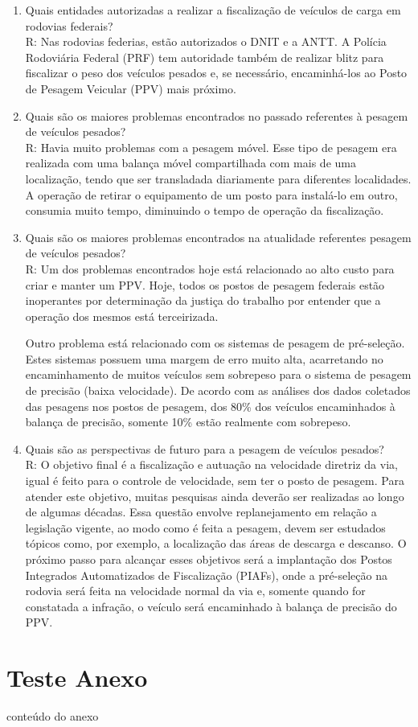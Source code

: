 \documentclass{ufscThesis}
\begin{document}
\begin{enumerate}
\item Quais entidades autorizadas a realizar a fiscalização de veículos de carga em rodovias federais?\\
R: Nas rodovias federias, estão autorizados o DNIT e a ANTT. A Polícia Rodoviária Federal (PRF) tem autoridade também de realizar blitz para fiscalizar o peso dos veículos pesados e, se necessário, encaminhá-los ao Posto de Pesagem Veicular (PPV) mais próximo.

\item Quais são os maiores problemas encontrados no passado referentes à pesagem de veículos pesados?\\
R: Havia muito problemas com a pesagem móvel. Esse tipo de pesagem era realizada com uma balança móvel compartilhada com mais de uma localização, tendo que ser transladada diariamente para diferentes localidades. A operação de retirar o equipamento de um posto para instalá-lo em outro, consumia muito tempo, diminuindo o tempo de operação da fiscalização.

\item Quais são os maiores problemas encontrados na atualidade referentes pesagem de veículos pesados?\\
R: Um dos problemas encontrados hoje está relacionado ao alto custo para criar e manter um PPV. Hoje, todos os postos de pesagem federais estão inoperantes por determinação da justiça do trabalho por entender que a operação dos mesmos está terceirizada. 

Outro problema está relacionado com os sistemas de pesagem de pré-seleção. 
Estes sistemas possuem uma margem de erro muito alta, acarretando no encaminhamento de muitos veículos sem sobrepeso para o sistema de pesagem de precisão (baixa velocidade). De acordo com as análises dos dados coletados das pesagens nos postos de pesagem, dos 80\% dos veículos encaminhados à balança de precisão, somente 10\% estão realmente com sobrepeso.

\item Quais são as perspectivas de futuro para a pesagem de veículos pesados?\\
R: O objetivo final é a fiscalização e autuação na velocidade diretriz da via, igual é feito para o controle de velocidade, sem ter o posto de pesagem. Para atender este objetivo, muitas pesquisas ainda deverão ser realizadas ao longo de algumas décadas. Essa questão envolve replanejamento em relação a legislação vigente, ao modo como é feita a pesagem, devem ser estudados tópicos como, por exemplo, a localização das áreas de descarga e descanso. O próximo passo para alcançar esses objetivos será a implantação dos Postos Integrados Automatizados de Fiscalização (PIAFs), onde a pré-seleção na rodovia será feita na velocidade normal da via e, somente quando for constatada a infração, o veículo será encaminhado à balança de precisão do PPV.

\end{enumerate}

\anexo
\chapter{Teste Anexo}
conteúdo do anexo
\end{document}
